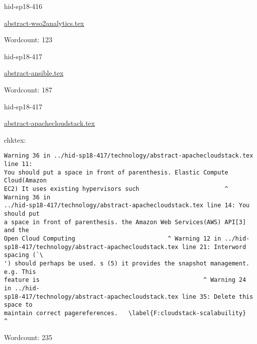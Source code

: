 

\begin{IU}

hid-sp18-416

\href{https://github.com/cloudmesh-community/hid-sp18-416/blob/master//technology/abstract-wso2analytics.tex}{abstract-wso2analytics.tex}

 

Wordcount: 123

\end{IU}



\begin{IU}

hid-sp18-417

\href{https://github.com/cloudmesh-community/hid-sp18-417/blob/master//technology/abstract-ansible.tex}{abstract-ansible.tex}

 

Wordcount: 187

\end{IU}



\begin{IU}

hid-sp18-417

\href{https://github.com/cloudmesh-community/hid-sp18-417/blob/master//technology/abstract-apachecloudstack.tex}{abstract-apachecloudstack.tex}

 
chktex:
\begin{tiny}
\begin{verbatim}
Warning 36 in ../hid-sp18-417/technology/abstract-apachecloudstack.tex line 11:
You should put a space in front of parenthesis. Elastic Compute Cloud(Amazon
EC2) It uses existing hypervisors such                        ^ Warning 36 in
../hid-sp18-417/technology/abstract-apachecloudstack.tex line 14: You should put
a space in front of parenthesis. the Amazon Web Services(AWS) API[3] and the
Open Cloud Computing                          ^ Warning 12 in ../hid-
sp18-417/technology/abstract-apachecloudstack.tex line 21: Interword spacing (`\
') should perhaps be used. s (5) it provides the snapshot management. e.g. This
feature is                                              ^ Warning 24 in ../hid-
sp18-417/technology/abstract-apachecloudstack.tex line 35: Delete this space to
maintain correct pagereferences.   \label{F:cloudstack-scalabuility}    ^
\end{verbatim}
\end{tiny}

Wordcount: 235

\end{IU}

